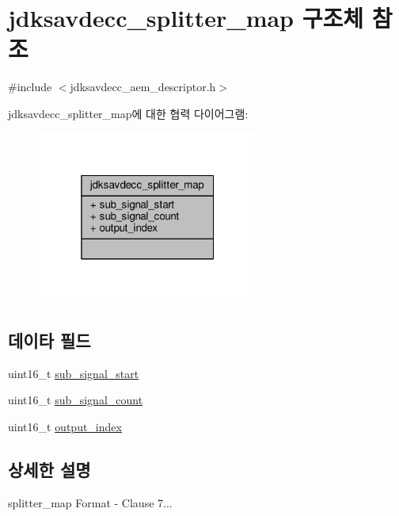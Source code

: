 \hypertarget{structjdksavdecc__splitter__map}{}\section{jdksavdecc\+\_\+splitter\+\_\+map 구조체 참조}
\label{structjdksavdecc__splitter__map}


{\ttfamily \#include $<$jdksavdecc\+\_\+aem\+\_\+descriptor.\+h$>$}



jdksavdecc\+\_\+splitter\+\_\+map에 대한 협력 다이어그램\+:
\nopagebreak
\begin{figure}[H]
\begin{center}
\leavevmode
\includegraphics[width=205pt]{structjdksavdecc__splitter__map__coll__graph}
\end{center}
\end{figure}
\subsection*{데이타 필드}
\begin{DoxyCompactItemize}
\item 
uint16\+\_\+t \hyperlink{structjdksavdecc__splitter__map_a4277ab8f00d35ea7381d919a79324a2f}{sub\+\_\+signal\+\_\+start}
\item 
uint16\+\_\+t \hyperlink{structjdksavdecc__splitter__map_a539ba5ac909f01c2b76e345233d20902}{sub\+\_\+signal\+\_\+count}
\item 
uint16\+\_\+t \hyperlink{structjdksavdecc__splitter__map_a894cb1dd2c8dab6ee5d8e165370fa0a7}{output\+\_\+index}
\end{DoxyCompactItemize}


\subsection{상세한 설명}
splitter\+\_\+map Format -\/ Clause 7... 

